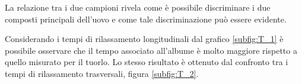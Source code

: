 La relazione tra i due campioni rivela come è possibile discriminare i due composti principali dell'uovo e come tale discriminazione può essere evidente.

Considerando i tempi di rilassamento longitudinali dal grafico \ref{subfig:T_1} è possibile osservare che il tempo associato all'albume è molto maggiore rispetto a quello misurato per il tuorlo. 
Lo stesso risultato è ottenuto dal confronto tra i tempi di rilassamento trasversali, figura \ref{subfig:T_2}.

\begin{figure}[h]
\centering
{} \quad
{} \\
\caption{}
\label{fig:Confronto}
\end{figure}

